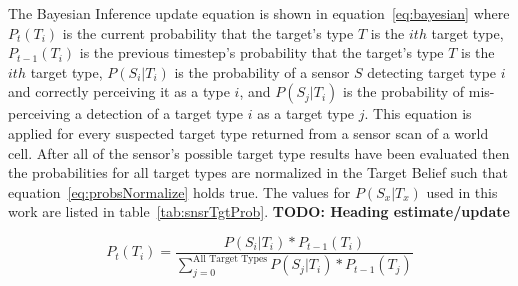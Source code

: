 \begin{multicols*}{2}
The Bayesian Inference update equation is shown in equation~\ref{eq:bayesian} where $P_{t}(T_{i})$ is the current probability that the target's type $T$ is the $ith$ target type, $P_{t-1}(T_{i})$ is the previous timestep's probability that the target's type $T$ is the $ith$ target type, $P(S_{i}|T_{i})$ is the probability of a sensor $S$ detecting target type $i$ and correctly perceiving it as a type $i$, and $P(S_{j}|T_{i})$ is the probability of mis-perceiving a detection of a target type $i$ as a target type $j$.  This equation is applied for every suspected target type returned from a sensor scan of a world cell. After all of the sensor's possible target type results have been evaluated then the probabilities for all target types are normalized in the Target Belief such that equation~\ref{eq:probsNormalize} holds true.  The values for $P(S_{x}|T_{x})$ used in this work are listed in table~\ref{tab:snsrTgtProb}. \textbf{TODO: Heading estimate/update}






\begin{equation}
\label{eq:bayesian}
P_{t}(T_{i}) = \frac{P(S_{i}|T_{i})*P_{t-1}(T_{i})}{ \sum_{j=0}^{\text{All Target Types}}P(S_{j}|T_{i}) * P_{t-1}(T_{j}) }
\end{equation}


\end{multicols*}
